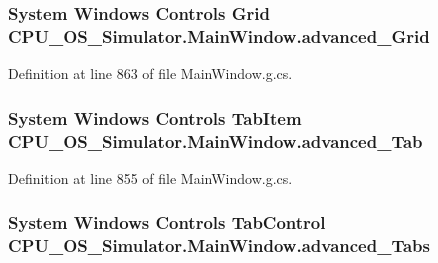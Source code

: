 \subsubsection[{advanced\+\_\+\+Grid}]{\setlength{\rightskip}{0pt plus 5cm}System Windows Controls Grid C\+P\+U\+\_\+\+O\+S\+\_\+\+Simulator.\+Main\+Window.\+advanced\+\_\+\+Grid\hspace{0.3cm}{\ttfamily [package]}}\label{class_c_p_u___o_s___simulator_1_1_main_window_a50b3891532cc5bfd0cc44e657bf95374}


Definition at line 863 of file Main\+Window.\+g.\+cs.

\hypertarget{class_c_p_u___o_s___simulator_1_1_main_window_aa0cf25219ff7ec68cccc82f780e5f817}{}
\subsubsection[{advanced\+\_\+\+Tab}]{\setlength{\rightskip}{0pt plus 5cm}System Windows Controls Tab\+Item C\+P\+U\+\_\+\+O\+S\+\_\+\+Simulator.\+Main\+Window.\+advanced\+\_\+\+Tab\hspace{0.3cm}{\ttfamily [package]}}\label{class_c_p_u___o_s___simulator_1_1_main_window_aa0cf25219ff7ec68cccc82f780e5f817}


Definition at line 855 of file Main\+Window.\+g.\+cs.

\hypertarget{class_c_p_u___o_s___simulator_1_1_main_window_a409f822cf5503ff0a45e14fb0f86a2aa}{}
\subsubsection[{advanced\+\_\+\+Tabs}]{\setlength{\rightskip}{0pt plus 5cm}System Windows Controls Tab\+Control C\+P\+U\+\_\+\+O\+S\+\_\+\+Simulator.\+Main\+Window.\+advanced\+\_\+\+Tabs\hspace{0.3cm}{\ttfamily [package]}}\label{class_c_p_u___o_s___simulator_1_1_main_window_a409f822cf5503ff0a45e14fb0f86a2aa}


